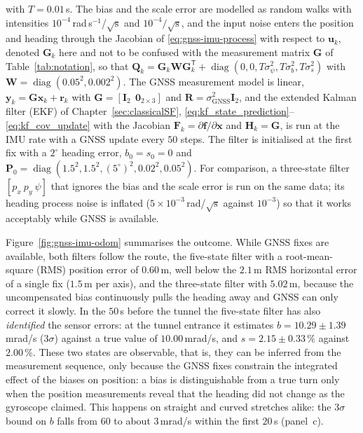 \documentclass[graybox,envcountchap]{style/SNmono}
\DeclareMathOperator{\diag}{diag}
\begin{document}
\begin{example}
with $T=0.01$\,s. The bias and the scale error are modelled as random walks with intensities $10^{-4}$\,rad\,s$^{-1}$/$\sqrt{\mathrm{s}}$ and $10^{-4}/\sqrt{\mathrm{s}}$, and the input noise enters the position and heading through the Jacobian of \eqref{eq:gnss-imu-process} with respect to $\mathbf{u}_{k}$, denoted $\mathbf{G}_{k}$ here and not to be confused with the measurement matrix $\mathbf{G}$ of Table~\ref{tab:notation}, so that $\mathbf{Q}_{k}=\mathbf{G}_{k}\mathbf{W}\mathbf{G}_{k}^{\mathsf T}+\diag(0,0,T\sigma_{\psi}^{2},T\sigma_{b}^{2},T\sigma_{s}^{2})$ with $\mathbf{W}=\diag(0.05^{2},0.002^{2})$. The GNSS measurement model is linear, $\mathbf{y}_{k}=\mathbf{G}\mathbf{x}_{k}+\mathbf{r}_{k}$ with $\mathbf{G}=[\mathbf{I}_{2}\ \ \mathbf{0}_{2\times3}]$ and $\mathbf{R}=\sigma_{\mathrm{GNSS}}^{2}\mathbf{I}_{2}$, and the extended Kalman filter (EKF) of Chapter~\ref{sec:classicalSF}, \eqref{eq:kf_state_prediction}--\eqref{eq:kf_cov_update} with the Jacobian $\mathbf{F}_{k}=\partial\mathbf{f}/\partial\mathbf{x}$ and $\mathbf{H}_{k}=\mathbf{G}$, is run at the IMU rate with a GNSS update every $50$ steps. The filter is initialised at the first fix with a $2^{\circ}$ heading error, $b_{0}=s_{0}=0$ and $\mathbf{P}_{0}=\diag(1.5^{2},1.5^{2},(5^{\circ})^{2},0.02^{2},0.05^{2})$. For comparison, a three-state filter $[p_{x}\ p_{y}\ \psi]$ that ignores the bias and the scale error is run on the same data; its heading process noise is inflated ($5\times10^{-3}$\,rad/$\sqrt{\mathrm{s}}$ against $10^{-3}$) so that it works acceptably while GNSS is available.

Figure~\ref{fig:gnss-imu-odom} summarises the outcome. While GNSS fixes are available, both filters follow the route, the five-state filter with a root-mean-square (RMS) position error of $0.60$\,m, well below the $2.1$\,m RMS horizontal error of a single fix ($1.5$\,m per axis), and the three-state filter with $5.02$\,m, because the uncompensated bias continuously pulls the heading away and GNSS can only correct it slowly. In the $50$\,s before the tunnel the five-state filter has also \emph{identified} the sensor errors: at the tunnel entrance it estimates $b=10.29\pm1.39$\,mrad/s ($3\sigma$) against a true value of $10.00$\,mrad/s, and $s=2.15\pm0.33$\,\% against $2.00$\,\%. These two states are observable, that is, they can be inferred from the measurement sequence, only because the GNSS fixes constrain the integrated effect of the biases on position: a bias is distinguishable from a true turn only when the position measurements reveal that the heading did not change as the gyroscope claimed. This happens on straight and curved stretches alike: the $3\sigma$ bound on $b$ falls from $60$ to about $3$\,mrad/s within the first $20$\,s (panel~c).


\end{example}
\end{document}
